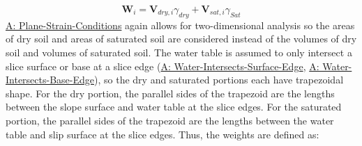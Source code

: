 \documentclass[12pt]{article}
\begin{document}
\begin{displaymath}
{\mathbf{W}}_{i}={\mathbf{V}_{dry,i}} {γ_{dry}}+{\mathbf{V}_{sat,i}} {γ_{Sat}}
\end{displaymath}
\hyperref[assumpPSC]{A: Plane-Strain-Conditions} again allows for two-dimensional analysis so the areas of dry soil and areas of saturated soil are considered instead of the volumes of dry soil and volumes of saturated soil. The water table is assumed to only intersect a slice surface or base at a slice edge (\hyperref[assumpWISE]{A: Water-Intersects-Surface-Edge}, \hyperref[assumpWIBE]{A: Water-Intersects-Base-Edge}), so the dry and saturated portions each have trapezoidal shape. For the dry portion, the parallel sides of the trapezoid are the lengths between the slope surface and water table at the slice edges. For the saturated portion, the parallel sides of the trapezoid are the lengths between the water table and slip surface at the slice edges. Thus, the weights are defined as:
\end{document}
